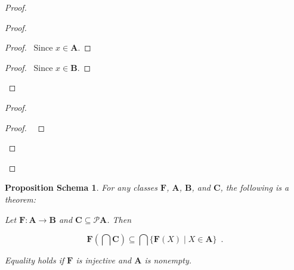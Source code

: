 \documentclass{book}
\let\qed\relax
\newtheorem{props}[ax]{Proposition Schema}
\theoremstyle{definition}
\begin{document}
\begin{proof}
\pf
{}
\begin{proof}
	\begin{proof}
		\pf\ Since $x \in \mathbf{A}$.
	\end{proof}
	\begin{proof}
		\pf\ Since $x \in \mathbf{B}$.
	\end{proof}
\end{proof}
\begin{proof}
	\begin{proof}
		\pf\ 
	\end{proof}
\end{proof}
\qed
\end{proof}

\begin{props}
\label{prop:imgint}
For any classes $\mathbf{F}$, $\mathbf{A}$, $\mathbf{B}$, and $\mathbf{C}$, the following is a theorem:

Let $\mathbf{F} : \mathbf{A} \rightarrow \mathbf{B}$ and $\mathbf{C} \subseteq \mathcal{P} \mathbf{A}$. Then

\[ \mathbf{F} \left( \bigcap \mathbf{C} \right) \subseteq \bigcap \{ \mathbf{F}(X) \mid X \in \mathbf{A} \} \enspace . \]

Equality holds if $\mathbf{F}$ is injective and $\mathbf{A}$ is nonempty.
\end{props}
\end{document}
